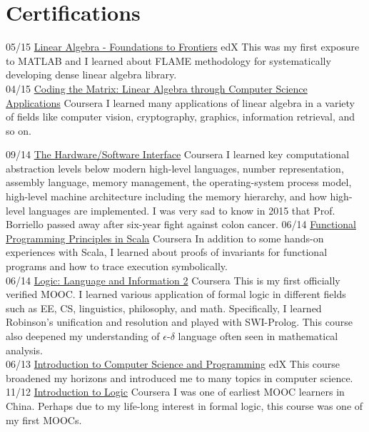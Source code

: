 \documentclass[a4paper]{friggeri-cv}
\begin{document}
\section{Certifications}
\begin{entrylist}
  \entry
  {05/15}
  {\href{https://s3.amazonaws.com/verify.edx.org/downloads/5eb2696ec8874930bb0fda0b8b6756b6/Certificate.pdf}{Linear Algebra - Foundations to Frontiers}}
  {edX}
  {This was my first exposure to MATLAB and I learned about FLAME methodology for systematically developing dense linear algebra library.\\}
  \entry
  {04/15}
  {\href{https://s3.amazonaws.com/accredible_user_certificate/certificates/144339/original/Coursera_matrix_2015.pdf}{Coding the Matrix: Linear Algebra through Computer Science Applications}}
  {Coursera}
  {I learned many applications of linear algebra in a variety of fields like computer vision, cryptography, graphics, information retrieval, and so on.\\}
\end{entrylist}
\begin{entrylist}
  \entry
  {09/14}
  {\href{https://s3.amazonaws.com/accredible_user_certificate/certificates/53611/original/Coursera_hwswinterface_2014.pdf}{The Hardware/Software Interface}}
  {Coursera}
  {I learned key computational abstraction levels below modern high-level languages, number representation, assembly language, memory management, the operating-system process model, high-level machine architecture including the memory hierarchy, and how high-level languages are implemented.  I was very sad to know in 2015 that Prof. Borriello passed away after six-year fight against colon cancer.}  
  \entry
  {06/14}
  {\href{https://www.coursera.org/account/accomplishments/records/jeAXpfyLDdj7TBYK}{Functional Programming Principles in Scala}}
  {Coursera}
  {In addition to some hands-on experiences with Scala, I learned about proofs of invariants for functional programs and how to trace execution symbolically.\\}
  \entry
  {06/14}
  {\href{https://www.coursera.org/account/accomplishments/records/AqU3pfW4qRTd8FzE}{Logic: Language and Information 2}}
  {Coursera}
  {This is my first officially verified MOOC.  I learned various application of formal logic in different fields such as EE, CS, linguistics, philosophy, and math.  Specifically, I learned Robinson's unification and resolution and played with SWI-Prolog.  This course also deepened my understanding of \(\epsilon\textit{-}\delta\) language often seen in mathematical analysis.\\}
  \entry
  {06/13}
  {\href{https://s3.amazonaws.com/verify.edx.org/downloads/eedec1d10b884139876bee106313142c/Certificate.pdf}{Introduction to Computer Science and Programming}}
  {edX}
  {This course broadened my horizons and introduced me to many topics in computer science.\\}
  \entry
  {11/12}
  {\href{https://s3.amazonaws.com/accredible_user_certificate/certificates/48300/original/IntroLogic.pdf}{Introduction to Logic}}
  {Coursera}
  {I was one of earliest MOOC learners in China.  Perhaps due to my life-long interest in formal logic, this course was one of my first MOOCs.}
\end{entrylist}
\end{document}

